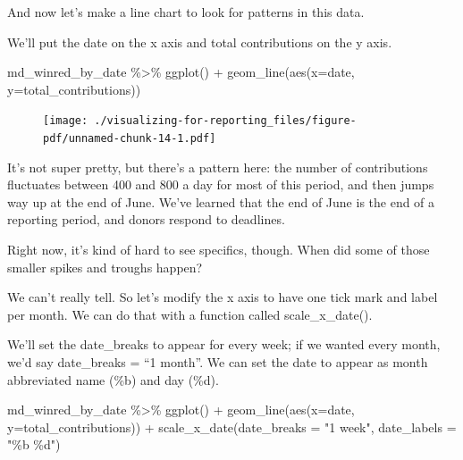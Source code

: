 \documentclass[
  letterpaper,
  DIV=11,
  numbers=noendperiod]{scrreprt}
\newenvironment{Shaded}{\begin{snugshade}}{\end{snugshade}}
\newcommand{\AttributeTok}[1]{\textcolor[rgb]{0.40,0.45,0.13}{#1}}
\newcommand{\FunctionTok}[1]{\textcolor[rgb]{0.28,0.35,0.67}{#1}}
\newcommand{\NormalTok}[1]{\textcolor[rgb]{0.00,0.23,0.31}{#1}}
\newcommand{\SpecialCharTok}[1]{\textcolor[rgb]{0.37,0.37,0.37}{#1}}
\newcommand{\StringTok}[1]{\textcolor[rgb]{0.13,0.47,0.30}{#1}}
\begin{document}
And now let's make a line chart to look for patterns in this data.

We'll put the date on the x axis and total contributions on the y axis.

\begin{Shaded}
\begin{Highlighting}[]
\NormalTok{md\_winred\_by\_date }\SpecialCharTok{\%\textgreater{}\%}
  \FunctionTok{ggplot}\NormalTok{() }\SpecialCharTok{+} 
  \FunctionTok{geom\_line}\NormalTok{(}\FunctionTok{aes}\NormalTok{(}\AttributeTok{x=}\NormalTok{date, }\AttributeTok{y=}\NormalTok{total\_contributions))}
\end{Highlighting}
\end{Shaded}

\begin{figure}[H]

{\centering \texttt{[image: ./visualizing-for-reporting\_files/figure-pdf/unnamed-chunk-14-1.pdf]}

}

\end{figure}

It's not super pretty, but there's a pattern here: the number of
contributions fluctuates between 400 and 800 a day for most of this
period, and then jumps way up at the end of June. We've learned that the
end of June is the end of a reporting period, and donors respond to
deadlines.

Right now, it's kind of hard to see specifics, though. When did some of
those smaller spikes and troughs happen?

We can't really tell. So let's modify the x axis to have one tick mark
and label per month. We can do that with a function called
scale\_x\_date().

We'll set the date\_breaks to appear for every week; if we wanted every
month, we'd say date\_breaks = ``1 month''. We can set the date to
appear as month abbreviated name (\%b) and day (\%d).

\begin{Shaded}
\begin{Highlighting}[]
\NormalTok{md\_winred\_by\_date }\SpecialCharTok{\%\textgreater{}\%}
  \FunctionTok{ggplot}\NormalTok{() }\SpecialCharTok{+} 
  \FunctionTok{geom\_line}\NormalTok{(}\FunctionTok{aes}\NormalTok{(}\AttributeTok{x=}\NormalTok{date, }\AttributeTok{y=}\NormalTok{total\_contributions)) }\SpecialCharTok{+} 
  \FunctionTok{scale\_x\_date}\NormalTok{(}\AttributeTok{date\_breaks =} \StringTok{"1 week"}\NormalTok{, }\AttributeTok{date\_labels =} \StringTok{"\%b \%d"}\NormalTok{)}
\end{Highlighting}
\end{Shaded}
\end{document}

